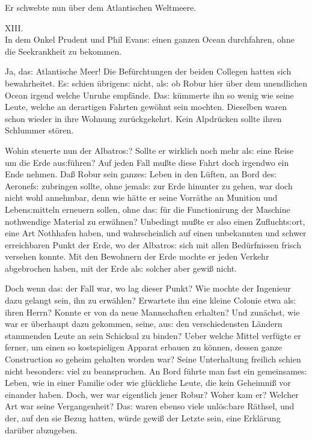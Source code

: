\documentclass[oneside,12pt]{book}
\newenvironment{antiqua}{\normalfont}{}
\newcommand{\s}{s:}
\begin{document}
Er schwebte nun \"uber dem Atlantischen Weltmeere.



\newpage\begin{center}\label{kap13}
{\large \begin{antiqua}XIII.\end{antiqua}\\
In dem Onkel Prudent und Phil Evan{\s} einen ganzen Ocean
durchfahren, ohne die Seekrankheit zu bekommen.\\\bigskip}
\end{center}



Ja, da{\s} Atlantische Meer! Die Bef\"urchtungen der beiden Collegen
hatten sich bewahrheitet. E{\s} schien \"ubrigen{\s} nicht, al{\s} ob
Robur hier \"uber dem unendlichen Ocean irgend welche Unruhe
empf\"ande. Da{\s} k\"ummerte ihn so wenig wie seine Leute, welche an
derartigen Fahrten gew\"ohnt sein mochten. Dieselben waren schon
wieder in ihre Wohnung zur\"uckgekehrt. Kein Alpdr\"ucken sollte
ihren Schlummer st\"oren.

Wohin steuerte nun der {\glqq}Albatro{\s}{\grqq}? Sollte er wirklich
noch mehr al{\s} eine Reise um die Erde au{\s}f\"uhren? Auf jeden
Fall mu{\ss}te diese Fahrt doch irgendwo ein Ende nehmen. Da{\ss}
Robur sein ganze{\s} Leben in den L\"uften, an Bord de{\s}
Aeronef{\s} zubringen sollte, ohne jemal{\s} zur Erde hinunter zu
gehen, war doch nicht wohl annehmbar, denn wie h\"atte er seine
Vorr\"athe an Munition und Leben{\s}mitteln erneuern sollen, ohne
da{\s} f\"ur die Functionirung der Maschine nothwendige Material zu
erw\"ahnen? Unbedingt mu{\ss}te er also einen Zuflucht{\s}ort, eine
Art Nothhafen haben, und wahrscheinlich auf einen unbekannten und
schwer erreichbaren Punkt der Erde, wo der {\glqq}Albatro{\s}{\grqq}
sich mit allen Bed\"urfnissen frisch versehen konnte. Mit den
Bewohnern der Erde mochte er jeden Verkehr abgebrochen haben, mit der
Erde al{\s} solcher aber gewi{\ss} nicht.

Doch wenn da{\s} der Fall war, wo lag dieser Punkt? Wie mochte der
Ingenieur dazu gelangt sein, ihn zu erw\"ahlen? Erwartete ihn eine
kleine Colonie etwa al{\s} ihren Herrn? Konnte er von da neue
Mannschaften erhalten? Und zun\"achst, wie war er \"uberhaupt dazu
gekommen, seine, au{\s} den verschiedensten L\"andern stammenden
Leute an sein Schicksal zu binden? Ueber welche Mittel verf\"ugte er
ferner, um einen so kostspieligen Apparat erbauen zu k\"onnen, dessen
ganze Construction so geheim gehalten worden war? Seine Unterhaltung
freilich schien nicht besonder{\s} viel zu beanspruchen. An Bord
f\"uhrte man fast ein gemeinsame{\s} Leben, wie in einer Familie oder
wie gl\"uckliche Leute, die kein Geheimni{\ss} vor einander haben.
Doch, wer war eigentlich jener Robur? Woher kam er? Welcher Art war
seine Vergangenheit? Da{\s} waren ebenso viele unl\"o{\s}bare
R\"athsel, und der, auf den sie Bezug hatten, w\"urde gewi{\ss} der
Letzte sein, eine Erkl\"arung dar\"uber abzugeben.
\end{document}
